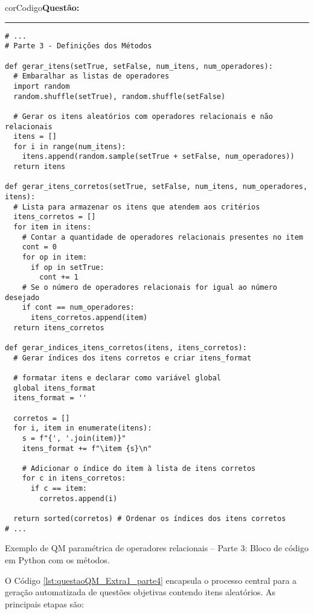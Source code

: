 \begin{listing}[!ht]
    \begin{myboxCode}{corCodigo}{\textbf{Questão: }}\vspace{3mm}
    \hrule
    \begin{verbatim}
# ...
# Parte 3 - Definições dos Métodos

def gerar_itens(setTrue, setFalse, num_itens, num_operadores):
  # Embaralhar as listas de operadores
  import random
  random.shuffle(setTrue), random.shuffle(setFalse)

  # Gerar os itens aleatórios com operadores relacionais e não relacionais
  itens = []
  for i in range(num_itens):
    itens.append(random.sample(setTrue + setFalse, num_operadores))
  return itens

def gerar_itens_corretos(setTrue, setFalse, num_itens, num_operadores, itens):
  # Lista para armazenar os itens que atendem aos critérios
  itens_corretos = []
  for item in itens:
    # Contar a quantidade de operadores relacionais presentes no item
    cont = 0
    for op in item:
      if op in setTrue:
        cont += 1
    # Se o número de operadores relacionais for igual ao número desejado
    if cont == num_operadores:
      itens_corretos.append(item)
  return itens_corretos

def gerar_indices_itens_corretos(itens, itens_corretos):
  # Gerar índices dos itens corretos e criar itens_format

  # formatar itens e declarar como variável global
  global itens_format
  itens_format = ''

  corretos = []
  for i, item in enumerate(itens):
    s = f"{', '.join(item)}"
    itens_format += f"\item {s}\n"

    # Adicionar o índice do item à lista de itens corretos
    for c in itens_corretos:
      if c == item:
        corretos.append(i)

  return sorted(corretos) # Ordenar os índices dos itens corretos
# ...
\end{verbatim}
\end{myboxCode}
\caption{Exemplo de QM paramétrica de operadores relacionais -- Parte 3: Bloco de código em Python com os métodos.}
\label{lst:questaoQM_Extra1_parte3}
\end{listing}

O Código \ref{lst:questaoQM_Extra1_parte4} encapsula o processo central para a geração automatizada de questões objetivas contendo itens aleatórios. As principais etapas são:

